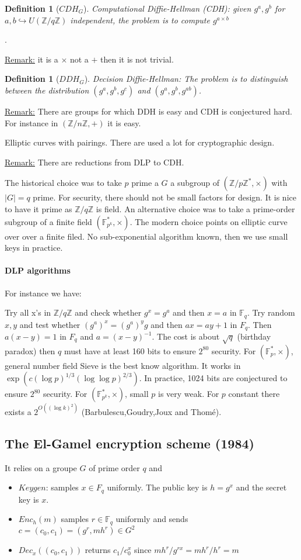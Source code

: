 \documentclass{article}
\newtheorem{defi}[thm]{Definition}
\newcommand{\Def}[3]{\begin{defi}[#1]\label{#2}#3\end{defi}}
\newcommand{\Rem}{\underline{Remark:} }
\newcommand{\Z}{\mathbb{Z}}
\newcommand{\F}{\mathbb{F}}
\begin{document}
\Def{$CDH_G$}{def:CDH}{Computational Diffie-Hellman (CDH): given $g^a,g^b$ for $a,b\hookrightarrow U(\Z/q\Z)$ independent, the problem is to compute $g^{a\times b}$}.

\Rem it is a $\times$ not a $+$ then it is not trivial.

\Def{$DDH_G$}{def:DDH}{Decision Diffie-Hellman: The problem is to distinguish between the distribution $(g^a,g^b,g^c)$ and $(g^a,g^b,g^{ab})$.}

\Rem There are groups for which DDH is easy and CDH is conjectured hard. For instance in $(\Z/n\Z,+)$ it is easy.

Elliptic curves with pairings. There are used a lot for cryptographic design.

\Rem There are reductions from DLP to CDH.

The historical choice was to take $p$ prime a $G$ a subgroup of $(\Z/p\Z^*,\times)$ with $|G|=q$ prime. For security, there should not be small factors for design. It is nice to have it prime as $\Z/q\Z$ is field. An alternative choice was to take a prime-order subgroup of a finite field $(\F_{p^k}^*,\times)$. The modern choice points on elliptic curve over over a finite filed. No sub-exponential algorithm known, then we use small keys in practice.

\paragraph{DLP algorithms} For instance we have:

\subitem Try all x's in $\Z/q\Z$ and check whether $g^x = g^a$ and then $x=a$ in $\F_q$.
\subitem Try random $x,y$ and test whether $(g^a)^x=(g^a)^yg$ and then $ax=ay+1$ in $F_q$. Then $a(x-y)=1$ in $F_q$ and $a=(x-y)^{-1}$. The cost is about $\sqrt{q}$ (birthday paradox) then $q$ must have at least 160 bits to ensure $2^{80}$ security.
\subitem For $(\F_p^*,\times)$, general number field Sieve is the best know algorithm. It works in $\exp(c(\log p)^{1/3}(\log\log p)^{2/3})$. In practice, 1024 bits are conjectured to ensure $2^80$ security.
\subitem For $(\F_{p^k}^*,\times)$, small $p$ is very weak. For $p$ constant there exists a $2^{O((\log k)^2)}$ (Barbulescu,Goudry,Joux and Thomé).

\subsection{The El-Gamel encryption scheme (1984)}
It relies on a groupe $G$ of prime order $q$ and \begin{itemize}
\item $Keygen$: samples $x\in F_q$ uniformly. The public key is $h=g^x$ and the secret key is $x$.
\item $Enc_h(m)$ samples $r\in\F_q$ uniformly and sends $c=(c_0,c_1)=(g^r,mh^r)\in G^2$
\item $Dec_x((c_0,c_1))$ returns $c_1/c_0^x$ since $mh^r/g^{rx}=mh^r/h^r=m$
\end{itemize}
\end{document}
